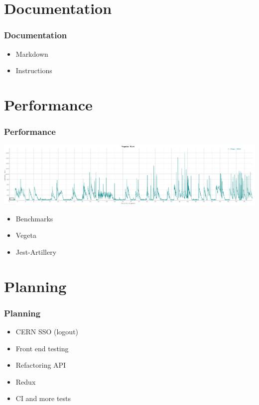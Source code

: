 \documentclass[12pt]{beamer}
\begin{document}
	\section{Documentation}
	\begin{frame}
		\frametitle{Documentation}
		\begin{itemize}
			\item Markdown
			\item Instructions
		\end{itemize}
	\end{frame}

	\section{Performance}
	\begin{frame}
		\frametitle{Performance}
		\includegraphics[scale=0.15]{vegeta-plot.png}
		\begin{itemize}
			\item Benchmarks
			\item Vegeta
			\item Jest-Artillery
		\end{itemize}
	\end{frame}

	\section{Planning}
	\begin{frame}
		\frametitle{Planning}
		\begin{itemize}
			\item CERN SSO (logout)
			\item Front end testing
			\item Refactoring API
			\item Redux
			\item CI and more tests
		\end{itemize}
	\end{frame}
\end{document}
